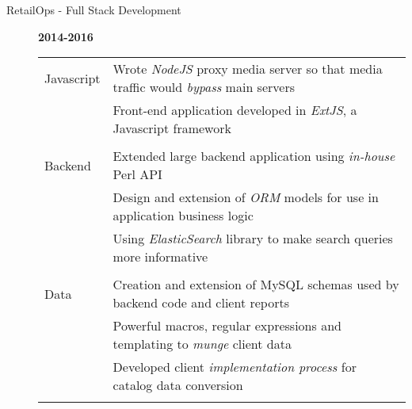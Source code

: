 \documentclass[12pt]{article}
\begin{document}
\begin{description}
\begin{description}
                \item[RetailOps - Full Stack Development] \hfill \textbf{2014-2016}\\
                    \begin{tabular}{l|l}
				\\[-1.0mm]
                        Javascript & Wrote \textit{NodeJS} proxy media server so that media traffic would \textit{bypass} main servers \\
				   & Front-end application developed in \textit{ExtJS}, a Javascript framework\\
				\\[-1.7mm]
                        Backend    & Extended large backend application using \textit{in-house} Perl API \\
                                   & Design and extension of \textit{ORM} models for use in application business logic \\
                                   & Using \textit{ElasticSearch} library to make search queries more informative\\
				\\[-1.7mm]
                        Data       & Creation and extension of MySQL schemas used by backend code and client reports\\
                                   & Powerful macros, regular expressions and templating to \textit{munge} client data\\
                        	   & Developed client \textit{implementation process} for catalog data conversion\\
				\\[-1.0mm]
                    \end{tabular}
            \end{description}


\end{description}
\end{document}
